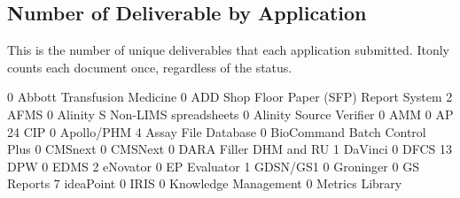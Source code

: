 \documentclass{article}
\begin{document}
\subsection{Number of Deliverable by Application}
This is the number of unique deliverables that each application submitted. Itonly counts
each document once, regardless of the status.
\begin{Schunk}
\begin{Soutput}
                                       0 
             Abbott Transfusion Medicine 
                                       0 
ADD Shop Floor Paper (SFP) Report System 
                                       2 
                                    AFMS 
                                       0 
         Alinity S Non-LIMS spreadsheets 
                                       0 
                 Alinity Source Verifier 
                                       0 
                                     AMM 
                                       0 
                               AP 24 CIP 
                                       0 
                              Apollo/PHM 
                                       4 
                     Assay File Database 
                                       0 
           BioCommand Batch Control Plus 
                                       0 
                                 CMSnext 
                                       0 
                                 CMSNext 
                                       0 
                  DARA Filler DHM and RU 
                                       1 
                                 DaVinci 
                                       0 
                                    DFCS 
                                      13 
                                     DPW 
                                       0 
                                    EDMS 
                                       2 
                                eNovator 
                                       0 
                            EP Evaluator 
                                       1 
                                GDSN/GS1 
                                       0 
                               Groninger 
                                       0 
                              GS Reports 
                                       7 
                               ideaPoint 
                                       0 
                                    IRIS 
                                       0 
                    Knowledge Management 
                                       0 
                         Metrics Library 

\end{Soutput}
\end{Schunk}
\end{document}
